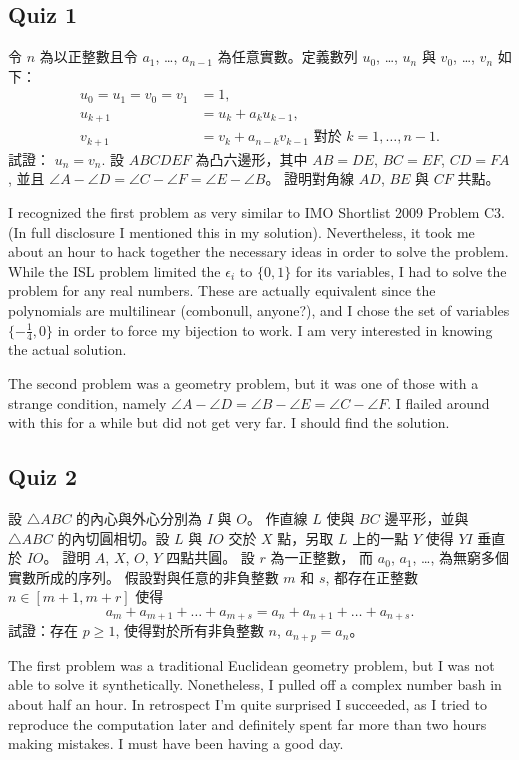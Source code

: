 \documentclass[11pt]{scrreprt}
\begin{document}
\subsection{Quiz 1}
\begin{enumerate}
  \ii 令 $n$ 為以正整數且令 $a_1$, \dots, $a_{n-1}$ 為任意實數。定義數列 $u_0$, \dots, $u_n$ 與 $v_0$, \dots, $v_n$ 如下：
  \begin{align*}
    u_0 = u_1 = v_0 = v_1 &= 1, \\
    u_{k+1} &= u_k + a_ku_{k-1}, \\
    v_{k+1} &= v_k + a_{n-k} v_{k-1}
    \text{ 對於 $k=1,\dots,n-1$}
    .
  \end{align*}
  試證： $u_n = v_n$. %
  \ii 設 $ABCDEF$ 為凸六邊形，其中 $AB=DE$, $BC=EF$, $CD=FA$, 並且 $\angle A - \angle D = \angle C - \angle F = \angle E - \angle B$。 證明對角線 $AD$, $BE$ 與 $CF$ 共點。 %
\end{enumerate}
I recognized the first problem as very similar to IMO Shortlist 2009 Problem C3. (In full disclosure I mentioned this in my solution). Nevertheless, it took me about an hour to hack together the necessary ideas in order to solve the problem. While the ISL problem limited the $\epsilon_i$ to $\{0,1\}$ for its variables, I had to solve the problem for any real numbers. These are actually equivalent since the polynomials are multilinear (combonull, anyone?), and I chose the set of variables $\{-\frac 14, 0\}$ in order to force my bijection to work. I am very interested in knowing the actual solution.

The second problem was a geometry problem, but it was one of those with a strange condition, namely $\angle A - \angle D = \angle B - \angle E = \angle C - \angle F$. I flailed around with this for a while but did not get very far. I should find the solution.

\subsection{Quiz 2}
\begin{enumerate}
  \ii 設 $\triangle ABC$ 的內心與外心分別為 $I$ 與 $O$。
  作直線 $L$ 使與 $BC$ 邊平形，並與 $\triangle ABC$ 的內切圓相切。設 $L$ 與 $IO$ 交於 $X$ 點，另取 $L$ 上的一點 $Y$ 使得 $YI$ 垂直於 $IO$。
  證明 $A$, $X$, $O$, $Y$ 四點共圓。
  \ii 設 $r$ 為一正整數， 而 $a_0$, $a_1$, \dots, 為無窮多個實數所成的序列。
  假設對與任意的非負整數 $m$ 和 $s$, 都存在正整數 $n \in [m+1, m+r]$ 使得
  \[ a_m + a_{m+1} + \dots + a_{m+s} = a_n + a_{n+1} + \dots + a_{n+s}. \]
  試證：存在 $p \ge 1$, 使得對於所有非負整數 $n$, $a_{n+p} = a_n$。 %
\end{enumerate}
The first problem was a traditional Euclidean geometry problem, but I was not able to solve it synthetically. Nonetheless, I pulled off a complex number bash in about half an hour. In retrospect I'm quite surprised I succeeded, as I tried to reproduce the computation later and definitely spent far more than two hours making mistakes. I must have been having a good day.
\end{document}
